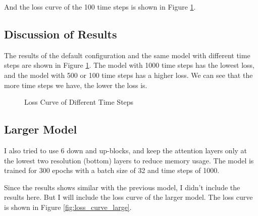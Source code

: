 And the loss curve of the 100 time steps is shown in Figure \ref{fig:loss_curve}.

\subsection{Discussion of Results}

The results of the default configuration and the same model with different time steps are shown in Figure \ref{fig:loss_curve}.
The model with 1000 time steps has the lowest loss, and the model with 500 or 100 time steps has a higher loss.
We can see that the more time steps we have, the lower the loss is.


\begin{figure}[H]
    \caption{Loss Curve of Different Time Steps}
    \label{fig:loss_curve}
\end{figure}

\subsection{Larger Model}

I also tried to use 6 down and up-blocks, and keep the attention layers only at the lowest two resolution (bottom) layers to reduce memory usage.
The model is trained for 300 epochs with a batch size of 32 and time steps of 1000.

Since the results shows similar with the previous model, I didn't include the results here.
But I will include the loss curve of the larger model.
The loss curve is shown in Figure \ref{fig:loss_curve_large}.
